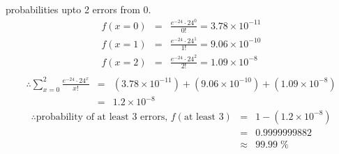 \documentclass{article}
\begin{document}
{    \hspace{1.5em}probabilities upto 2 errors from 0.
    \begin{eqnarray*}
        f(x=0) &=& \frac{e^{-24}\cdot 24^0}{0!} = 3.78\times10^{-11}\\
        f(x=1) &=& \frac{e^{-24}\cdot 24^1}{1!} = 9.06\times10^{-10}\\
        f(x=2) &=& \frac{e^{-24}\cdot 24^2}{2!} = 1.09\times10^{-8}\\
    \end{eqnarray*}
    \begin{eqnarray*}
        \therefore \sum_{x=0}^{2} \frac{e^{-24}\cdot 24^x}{x!} &=& (3.78\times 10^{-11}) + (9.06 \times 10^{-10}) + (1.09 \times 10^{-8})\\
        &=& 1.2\times 10^{-8}
    \end{eqnarray*}
    \begin{eqnarray*}
        \therefore \text{probability of at least 3 errors, } f(\text{at least 3}) &=& 1 - (1.2\times 10^{-8})\\
        &=& 0.9999999882\\
        &\approx& 99.99\;\%
    \end{eqnarray*}



}
\newpage

\section{}
\end{document}
